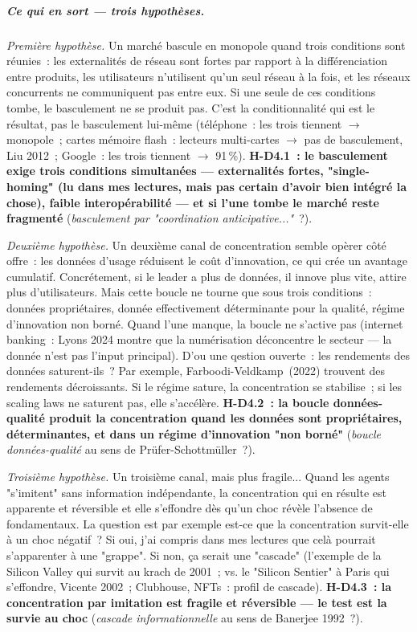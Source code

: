 \subparagraph{Ce qui en sort --- trois hypoth\`eses.}

\emph{Premi\`ere hypoth\`ese.} Un march\'e bascule en monopole quand trois conditions sont r\'eunies~: les externalit\'es de r\'eseau sont fortes par rapport \`a la diff\'erenciation entre produits, les utilisateurs n'utilisent qu'un seul r\'eseau \`a la fois, et les r\'eseaux concurrents ne communiquent pas entre eux. Si une seule de ces conditions tombe, le basculement ne se produit pas. C'est la conditionnali\-t\'e qui est le r\'esultat, pas le basculement lui-m\^eme (t\'el\'ephone~: les trois tiennent $\to$ monopole~; cartes m\'emoire flash~: lecteurs multi-cartes $\to$ pas de basculement, Liu 2012~; Google~: les trois tiennent $\to$ 91\,\%). \textbf{H-D4.1~: le basculement exige trois conditions simultan\'ees --- externalit\'es fortes, "single-homing" (lu dans mes lectures, mais pas certain d'avoir bien intégré la chose), faible interop\'erabilit\'e --- et si l'une tombe le march\'e reste fragment\'e} (\emph{basculement par "coordination anticipative..."}~?).

\emph{Deuxi\`eme hypoth\`ese.} Un deuxi\`eme canal de concentration semble op\`erer c\^ot\'e offre~: les donn\'ees d'usage r\'eduisent le co\^ut d'innovation, ce qui cr\'ee un avantage cumulatif. Concrétement, si le leader a plus de donn\'ees, il innove plus vite, attire plus d'utilisateurs. Mais cette boucle ne tourne que sous trois conditions~: donn\'ees propri\'etaires, donn\'ee effectivement d\'eterminante pour la qualit\'e, r\'egime d'innovation non born\'e. Quand l'une manque, la boucle ne s'active pas (internet banking~: Lyons 2024 montre que la num\'erisation d\'econcentre le secteur --- la donn\'ee n'est pas l'input principal). D'ou une qestion ouverte~: les rendements des donn\'ees saturent-ils~? Par exemple, Farboodi-Veldkamp~(2022) trouvent des rendements d\'ecroissants. Si le r\'egime sature, la concentration se stabilise~; si les scaling laws ne saturent pas, elle s'acc\'el\`ere. \textbf{H-D4.2~: la boucle donn\'ees-qualit\'e produit la concentration quand les donn\'ees sont propri\'etaires, d\'eterminantes, et dans un r\'egime d'innovation "non born\'e"} (\emph{boucle donn\'ees-qualit\'e} au sens de Pr\"ufer-Schottm\"uller~?).

\emph{Troisi\`eme hypoth\`ese.} Un troisi\`eme canal, mais plus fragile... Quand les agents "s'imitent" sans information ind\'ependante, la concentration qui en r\'esulte est apparente et r\'eversible et elle s'effondre d\`es qu'un choc r\'ev\`ele l'absence de fondamentaux. La question est par exemple est-ce que la concentration survit-elle \`a un choc n\'egatif~? Si oui, j'ai compris dans mes lectures que celà pourrait s'apparenter à une "grappe". Si non, ça serait une "cascade" (l'exemple de la Silicon Valley qui survit au krach de 2001~; vs. le "Silicon Sentier" à Paris qui s'effondre, Vicente 2002~; Clubhouse, NFTs~: profil de cascade). \textbf{H-D4.3~: la concentration par imitation est fragile et r\'eversible --- le test est la survie au choc} (\emph{cascade informationnelle} au sens de Banerjee 1992~?).

